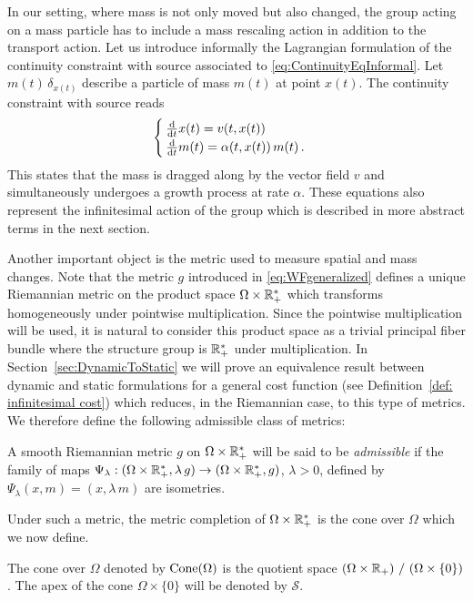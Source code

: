 In our setting, where mass is not only moved but also changed, the group acting on a mass particle has to include a mass rescaling action in addition to the transport action. Let us introduce informally the Lagrangian formulation of the continuity constraint with source associated to \eqref{eq:ContinuityEqInformal}. Let $m(t)\, \delta_{x(t)}$ describe a particle of mass $m(t)$ at point $x(t)$. The continuity constraint with source reads
\begin{equation}\label{ParticleFormulation}
\begin{cases}
\frac{\mathrm{d}}{\mathrm{d} t} x(t)  = v(t,x(t))\\
\frac{\mathrm{d}}{\mathrm{d} t} m(t) = \alpha(t,x(t))\, m(t)\,.
\end{cases}
\end{equation}
This states that the mass is dragged along by the vector field $v$ and simultaneously undergoes a growth process at rate $\alpha$. These equations  also represent the infinitesimal action of the group which is described in more abstract terms in the next section. 

Another important object is the metric used to measure spatial and mass changes. Note that the metric $g$ introduced in \eqref{eq:WFgeneralized} defines a unique Riemannian metric on the product space $\Omega \times \mathbb{R}_+^*$ which transforms homogeneously under pointwise multiplication. Since the pointwise multiplication will be used, it is natural to consider this product space as a trivial principal fiber bundle where the structure group is $\mathbb{R}^*_+$ under multiplication. In Section~\ref{sec:DynamicToStatic} we will prove an equivalence result between dynamic and static formulations for a general cost function (see Definition~\ref{def: infinitesimal cost}) which reduces, in the Riemannian case, to this type of metrics.
We therefore define the following admissible class of metrics:

 \begin{definition}\label{AdmissibleMetrics}
 A smooth Riemannian metric $g$ on $\Omega \times \mathbb{R}_+^*$ will be said to be \textit{admissible} if 
the family of maps $\Psi_\lambda:(\Omega \times \mathbb{R}_+^*,\lambda\, g) \to (\Omega \times \mathbb{R}_+^*, g)$, $\lambda > 0$, defined by $\Psi_\lambda(x,m)= (x,\lambda\, m)$ are isometries.
\end{definition}
Under such a metric, the metric completion of $\Omega \times \mathbb{R}_+^*$ is the cone over $\Omega$ which we now define.
\begin{definition}[Cone]\label{def:Cone}
The cone over $\Omega$ denoted by $\operatorname{Cone}(\Omega)$ is the quotient space $\left(\Omega \times \mathbb{R}_+\right) \, / \, \left(\Omega \times \{ 0\}\right)$. The apex of the cone $\Omega \times \{ 0\}$ will be denoted by $\mathcal{S}$.
\end{definition}

